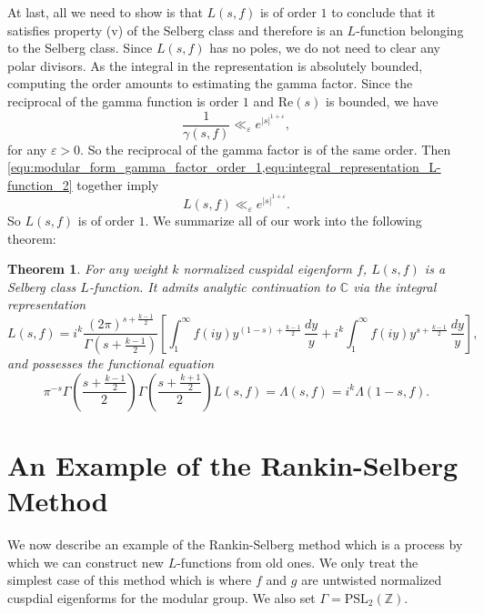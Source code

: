 \documentclass[12pt]{book}
\newtheorem{theorem}{Theorem}[section]
\theoremstyle{definition}\newframedtheorem{method}{Method}
\newcommand{\PSL}{\mathrm{PSL}}
\newcommand{\Z}{\mathbb{Z}}
\newcommand{\C}{\mathbb{C}}
\newcommand{\g}{\gamma}
\newcommand{\G}{\Gamma}
\renewcommand{\L}{\Lambda}
\newcommand{\e}{\varepsilon}
\newcommand{\<}{\langle}
\renewcommand{\>}{\rangle}
\renewcommand{\Re}{\mathrm{Re}}
\begin{document}
      At last, all we need to show is that $L(s,f)$ is of order $1$ to conclude that it satisfies property (v) of the Selberg class and therefore is an $L$-function belonging to the Selberg class. Since $L(s,f)$ has no poles, we do not need to clear any polar divisors. As the integral in the representation is absolutely bounded, computing the order amounts to estimating the gamma factor. Since the reciprocal of the gamma function is order $1$ and $\Re(s)$ is bounded, we have
      \begin{equation}\label{equ:modular_form_gamma_factor_order_1}
        \frac{1}{\g(s,f)} \ll_{\e} e^{|s|^{1+\e}},
      \end{equation}
      for any $\e > 0$. So the reciprocal of the gamma factor is of the same order. Then \cref{equ:modular_form_gamma_factor_order_1,equ:integral_representation_L-function_2} together imply
      \[
        L(s,f) \ll_{\e} e^{|s|^{1+\e}}.
      \]
      So $L(s,f)$ is of order $1$. We summarize all of our work into the following theorem:

      \begin{theorem}
        For any weight $k$ normalized cuspidal eigenform $f$, $L(s,f)$ is a Selberg class $L$-function. It admits analytic continuation to $\C$ via the integral representation
        \[
          L(s,f) = i^{k}\frac{(2\pi)^{s+\frac{k-1}{2}}}{\G(s+\frac{k-1}{2})}\left[\int_{1}^{\infty}f(iy)y^{(1-s)+\frac{k-1}{2}}\,\frac{dy}{y}+i^{k}\int_{1}^{\infty}f(iy)y^{s+\frac{k-1}{2}}\,\frac{dy}{y}\right],
        \]
        and possesses the functional equation
        \[
          \pi^{-s}\G\left(\frac{s+\frac{k-1}{2}}{2}\right)\G\left(\frac{s+\frac{k+1}{2}}{2}\right)L(s,f) = \L(s,f) = i^{k}\L(1-s,f).
        \]
      \end{theorem}
  \section{An Example of the Rankin-Selberg Method}\label{sec:An_Example_of_the_Rankin-Selberg_Method}
    We now describe an example of the Rankin-Selberg method which is a process by which we can construct new $L$-functions from old ones. We only treat the simplest case of this method which is where $f$ and $g$ are untwisted normalized cuspdial eigenforms for the modular group. We also set $\G = \PSL_{2}(\Z)$.
\end{document}
